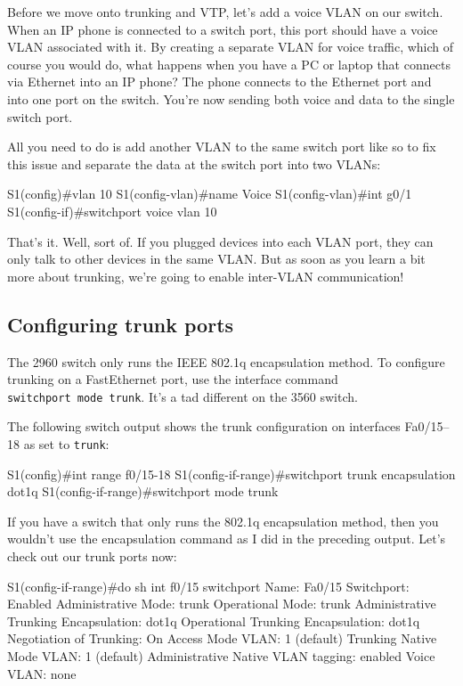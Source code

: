 Before we move onto trunking and VTP, let's add a voice VLAN on our
switch. When an IP phone is connected to a switch port, this port should
have a voice VLAN associated with it. By creating a separate VLAN for
voice traffic, which of course you would do, what happens when you have
a PC or laptop that connects via Ethernet into an IP phone? The phone
connects to the Ethernet port and into one port on the switch. You're
now sending both voice and data to the single switch port.

All you need to do is add another VLAN to the same switch port like so
to fix this issue and separate the data at the switch port into two
VLANs:

\begin{cli}
S1(config)#vlan 10
S1(config-vlan)#name Voice
S1(config-vlan)#int g0/1
S1(config-if)#switchport voice vlan 10
\end{cli}

That's it. Well, sort of. If you plugged devices into each VLAN port,
they can only talk to other devices in the same VLAN. But as soon as you
learn a bit more about trunking, we're going to enable inter-VLAN
communication!

\subsection{Configuring trunk ports}

The 2960 switch only runs the IEEE 802.1q encapsulation method. To
configure trunking on a FastEthernet port, use the interface command
\texttt{switchport\ mode\ trunk}. It's a tad different on the 3560
switch.

The following switch output shows the trunk configuration on interfaces
Fa0/15--18 as set to \texttt{trunk}:

\begin{cli}
S1(config)#int range f0/15-18
S1(config-if-range)#switchport trunk encapsulation dot1q
S1(config-if-range)#switchport mode trunk
\end{cli}

If you have a switch that only runs the 802.1q encapsulation method, then you wouldn't use
the encapsulation command as I did in the preceding output. Let's check
out our trunk ports now:

\begin{cli}
S1(config-if-range)#do sh int f0/15 switchport
Name: Fa0/15
Switchport: Enabled
Administrative Mode: trunk
Operational Mode: trunk
Administrative Trunking Encapsulation: dot1q
Operational Trunking Encapsulation: dot1q
Negotiation of Trunking: On
Access Mode VLAN: 1 (default)
Trunking Native Mode VLAN: 1 (default)
Administrative Native VLAN tagging: enabled
Voice VLAN: none
\end{cli}

